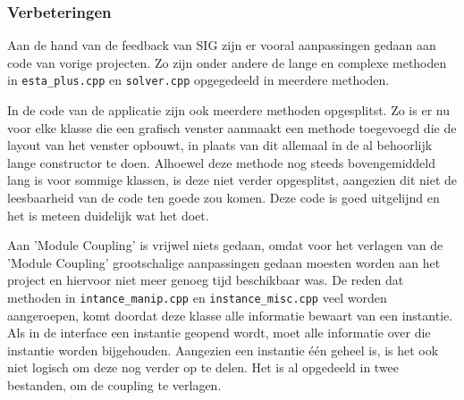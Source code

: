 \subsubsection{Verbeteringen}
Aan de hand van de feedback van SIG zijn er vooral aanpassingen gedaan aan code van vorige projecten. Zo zijn onder andere de lange en complexe methoden in \texttt{esta\_plus.cpp} en \texttt{solver.cpp} opgegedeeld in meerdere methoden. 

In de code van de applicatie zijn ook meerdere methoden opgesplitst. Zo is er nu voor elke klasse die een grafisch venster aanmaakt een methode toegevoegd die de layout van het venster opbouwt, in plaats van dit allemaal in de al behoorlijk lange constructor te doen. Alhoewel deze methode nog steeds bovengemiddeld lang is voor sommige klassen, is deze niet verder opgesplitst, aangezien dit niet de leesbaarheid van de code ten goede zou komen. Deze code is goed uitgelijnd en het is meteen duidelijk wat het doet.

Aan 'Module Coupling' is vrijwel niets gedaan, omdat voor het verlagen van de 'Module Coupling' grootschalige aanpassingen gedaan moesten worden aan het project en hiervoor niet meer genoeg tijd beschikbaar was. De reden dat methoden in \texttt{intance\_manip.cpp} en \texttt{instance\_misc.cpp} veel worden aangeroepen, komt doordat deze klasse alle informatie bewaart van een instantie. Als in de interface een instantie geopend wordt, moet alle informatie over die instantie worden bijgehouden. Aangezien een instantie \'e\'en geheel is, is het ook niet logisch om deze nog verder op te delen. Het is al opgedeeld in twee bestanden, om de coupling te verlagen.
